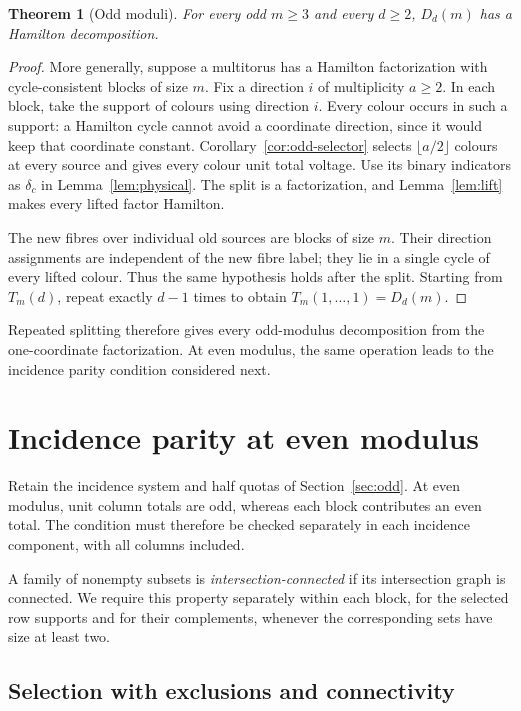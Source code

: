 \documentclass[11pt,reqno]{amsart}
\numberwithin{equation}{section}
\newtheorem{theorem}{Theorem}[section]
\theoremstyle{definition}
\theoremstyle{remark}
\begin{document}
\begin{theorem}[Odd moduli]\label{thm:oddmod}
For every odd $m\ge3$ and every $d\ge2$, $D_d(m)$ has a Hamilton decomposition.
\end{theorem}
\begin{proof}
More generally, suppose a multitorus has a Hamilton factorization with
cycle-consistent blocks of size $m$. Fix a direction $i$ of multiplicity
$a\ge2$. In each block, take the support of colours using direction $i$.
Every colour occurs in such a support: a Hamilton cycle cannot avoid a
coordinate direction, since it would keep that coordinate constant.
Corollary~\ref{cor:odd-selector} selects $\lfloor a/2\rfloor$ colours at
every source and gives every colour unit total voltage. Use its binary
indicators as $\delta_c$ in Lemma~\ref{lem:physical}. The split is a
factorization, and Lemma~\ref{lem:lift} makes every lifted factor Hamilton.

The new fibres over individual old sources are blocks of size $m$.
Their direction assignments are independent of the new fibre label;
they lie in a single cycle of every lifted colour. Thus the same
hypothesis holds after the split. Starting from $T_m(d)$, repeat exactly
$d-1$ times to obtain $T_m(1,\ldots,1)=D_d(m)$.
\end{proof}

Repeated splitting therefore gives every odd-modulus decomposition
from the one-coordinate factorization. At even modulus, the same
operation leads to the incidence parity condition considered next.

\section{Incidence parity at even modulus}\label{sec:even-selection}
Retain the incidence system and half quotas of Section~\ref{sec:odd}.
At even modulus, unit column totals are odd, whereas each block contributes
an even total. The condition must therefore be checked separately in
each incidence component, with all columns included.

A family of nonempty subsets is \emph{intersection-connected} if its
intersection graph is connected. We require this property separately within each
block, for the selected row supports and for their complements, whenever the
corresponding sets have size at least two.

\subsection{Selection with exclusions and connectivity}
\end{document}

